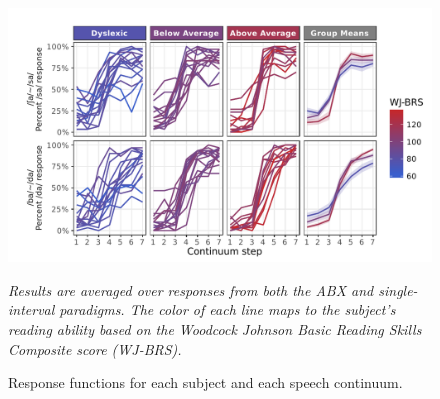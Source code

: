 \documentclass[../uwthesis.tex]{subfiles}
\begin{document}
\begin{figure}
    \centering
    \caption{Response functions for each subject and each speech continuum.}
    \label{fig:b}
    \includegraphics{images/paper_1/figure_individ_and_mean_resp_curves_by_group.pdf}
    \item \textit{Results are averaged over responses from both the ABX and single-interval paradigms. The color of each line maps to the subject’s reading ability based on the Woodcock Johnson Basic Reading Skills Composite score (WJ-BRS).}
\end{figure}
\end{document}
